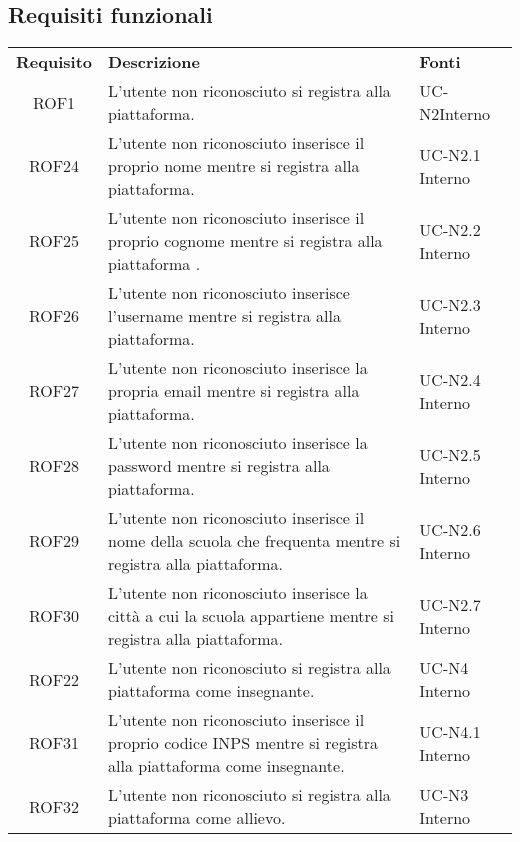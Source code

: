 \subsection{Requisiti funzionali}
\begin{tabularx}{\textwidth}{| c | p{10cm} | X |}
		\rowcolor{LightBlue}
		\color{white}\bfseries Requisito & \color{white}\bfseries Descrizione & \color{white}\bfseries Fonti\\[0.25cm]
		ROF1 & L'utente non riconosciuto si registra alla piattaforma. & UC-N2\newline Interno\\
		ROF24 & L'utente non riconosciuto inserisce il proprio nome mentre si registra alla piattaforma. & UC-N2.1 \newline Interno\\
		ROF25 & L'utente non riconosciuto inserisce il proprio cognome mentre si registra alla piattaforma . & UC-N2.2 \newline Interno\\
		ROF26 & L'utente non riconosciuto inserisce l'username mentre si registra alla piattaforma. & UC-N2.3 \newline Interno\\
		ROF27 & L'utente non riconosciuto inserisce la propria email mentre si registra alla piattaforma. & UC-N2.4 \newline Interno\\
		ROF28 & L'utente non riconosciuto inserisce la password mentre si registra alla piattaforma. & UC-N2.5 \newline Interno\\
		ROF29 & L'utente non riconosciuto inserisce il nome della scuola che frequenta mentre si registra alla piattaforma. & UC-N2.6 \newline Interno\\
		ROF30 & L'utente non riconosciuto inserisce la città a cui la scuola appartiene mentre si registra alla piattaforma. & UC-N2.7 \newline Interno\\
		ROF22 & L'utente non riconosciuto si registra alla piattaforma come insegnante. & UC-N4 \newline Interno\\
		ROF31 & L'utente non riconosciuto inserisce il proprio codice INPS mentre si registra alla piattaforma come insegnante. & UC-N4.1 \newline Interno\\
		ROF32 & L'utente non riconosciuto si registra alla piattaforma come allievo. & UC-N3 \newline Interno\\	

\end{tabularx}
